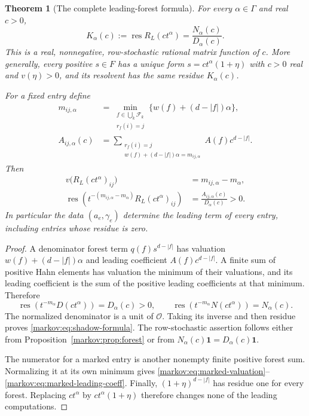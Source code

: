 \documentclass[11pt]{article}
\numberwithin{equation}{section}
\newtheorem{theorem}{Theorem}[section]
\theoremstyle{definition}
\theoremstyle{remark}
\newcommand{\F}{\mathcal F}
\newcommand{\Ocal}{\mathcal O}
\newcommand{\one}{\mathbf 1}
\newcommand{\res}{\operatorname{res}}
\begin{document}
\begin{theorem}[The complete leading-forest formula]\label{markov:thm:leading}
For every $\alpha\in\Gamma$ and real $c>0$,
\begin{equation}\label{markov:eq:shadow-formula}
 K_\alpha(c):=\res R_L(c t^\alpha)
 =\frac{N_\alpha(c)}{D_\alpha(c)}.
\end{equation}
This is a real, nonnegative, row-stochastic rational matrix function of $c$.
More generally, every positive $s\in F$ has a unique form
$s=c t^\alpha(1+\eta)$ with $c>0$ real and $v(\eta)>0$, and its resolvent has the
same residue $K_\alpha(c)$.

For a fixed entry define
\begin{align}
 m_{ij,\alpha}
 &=\min_{\substack{f\in\bigcup_k\F_k\\r_f(i)=j}}
       \{w(f)+(d-|f|)\alpha\},\label{markov:eq:marked-min}\\
 A_{ij,\alpha}(c)
 &=\sum_{\substack{r_f(i)=j\\w(f)+(d-|f|)\alpha=m_{ij,\alpha}}}
       A(f)c^{d-|f|}.\label{markov:eq:marked-amplitude}
\end{align}
Then
\begin{align}
 v\bigl(R_L(c t^\alpha)_{ij}\bigr)
   &=m_{ij,\alpha}-m_\alpha,\label{markov:eq:marked-valuation}\\
 \res\!\left(t^{-(m_{ij,\alpha}-m_\alpha)}R_L(c t^\alpha)_{ij}\right)
   &=\frac{A_{ij,\alpha}(c)}{D_\alpha(c)}>0.
   \label{markov:eq:marked-leading-coeff}
\end{align}
In particular the data $(a_e,\gamma_e)$ determine the leading term of every
entry, including entries whose residue is zero.
\end{theorem}

\begin{proof}
A denominator forest term $q(f)s^{d-|f|}$ has valuation
$w(f)+(d-|f|)\alpha$ and leading coefficient $A(f)c^{d-|f|}$. A finite sum of
positive Hahn elements has valuation the minimum of their valuations, and its
leading coefficient is the sum of the positive leading coefficients at that
minimum. Therefore
\[
 \res(t^{-m_\alpha}D(c t^\alpha))=D_\alpha(c)>0,
 \qquad
 \res(t^{-m_\alpha}N(c t^\alpha))=N_\alpha(c).
\]
The normalized denominator is a unit of $\Ocal$. Taking its inverse and then
residue proves \eqref{markov:eq:shadow-formula}. The row-stochastic assertion follows
either from Proposition~\ref{markov:prop:forest} or from
$N_\alpha(c)\one=D_\alpha(c)\one$.

The numerator for a marked entry is another nonempty finite positive forest
sum. Normalizing it at its own minimum gives
\eqref{markov:eq:marked-valuation}--\eqref{markov:eq:marked-leading-coeff}. Finally,
$(1+\eta)^{d-|f|}$ has residue one for every forest. Replacing $c t^\alpha$ by
$c t^\alpha(1+\eta)$ therefore changes none of the leading computations.
\end{proof}
\end{document}
